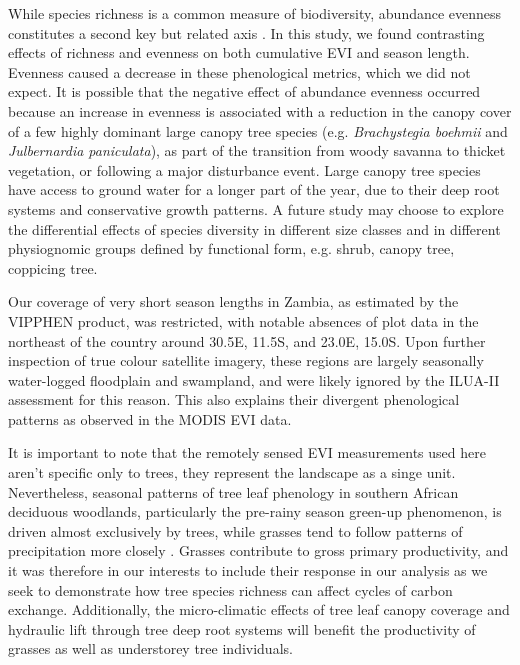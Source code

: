 \documentclass[11pt,a4paper]{article}
\begin{document}
While species richness is a common measure of biodiversity, abundance evenness constitutes a second key but related axis \citep{Wilsey2005, Hillebrand2008, Jost2010}. In this study, we found contrasting effects of richness and evenness on both cumulative EVI and season length. Evenness caused a decrease in these phenological metrics, which we did not expect. It is possible that the negative effect of abundance evenness occurred because an increase in evenness is associated with a reduction in the canopy cover of a few highly dominant large canopy tree species (e.g. \textit{Brachystegia boehmii} and \textit{Julbernardia paniculata}), as part of the transition from woody savanna to thicket vegetation, or following a major disturbance event. Large canopy tree species have access to ground water for a longer part of the year, due to their deep root systems and conservative growth patterns. A future study may choose to explore the differential effects of species diversity in different size classes and in different physiognomic groups defined by functional form, e.g. shrub, canopy tree, coppicing tree.

Our coverage of very short season lengths in Zambia, as estimated by the VIPPHEN product, was restricted, with notable absences of plot data in the northeast of the country around 30.5\textdegree{}E, 11.5\textdegree{}S, and 23.0\textdegree{}E, 15.0\textdegree{}S. Upon further inspection of true colour satellite imagery, these regions are largely seasonally water-logged floodplain and swampland, and were likely ignored by the ILUA-II assessment for this reason. This also explains their divergent phenological patterns as observed in the MODIS EVI data. 

It is important to note that the remotely sensed EVI measurements used here aren't specific only to trees, they represent the landscape as a singe unit. Nevertheless, seasonal patterns of tree leaf phenology in southern African deciduous woodlands, particularly the pre-rainy season green-up phenomenon, is driven almost exclusively by trees, while grasses tend to follow patterns of precipitation more closely \citep{Whitecross2017, Archibald2007, Higgins2011}. Grasses contribute to gross primary productivity, and it was therefore in our interests to include their response in our analysis as we seek to demonstrate how tree species richness can affect cycles of carbon exchange. Additionally, the micro-climatic effects of tree leaf canopy coverage and hydraulic lift through tree deep root systems will benefit the productivity of grasses as well as understorey tree individuals.
\end{document}
